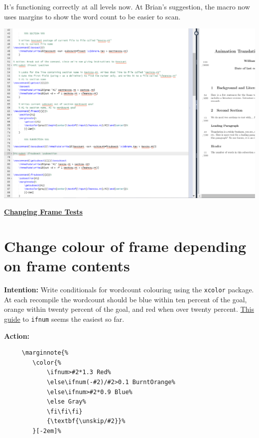 \documentclass[12pt]{article}
\begin{document}
It's functioning correctly at all levels now. At Brian's suggestion, the macro now uses margins to show the word count to be easier to scan.

\includegraphics[width=\textwidth]{imgelaborationmargincount.PNG}

\newpage\underline{\textbf{\Large{Changing Frame Tests}}}

\section{\large Change colour of frame depending on frame contents}

\textbf{Intention:} Write conditionals for wordcount colouring using the \texttt{xcolor} package. At each recompile the wordcount should be blue within ten percent of the goal, orange within twenty percent of the goal, and red when over twenty percent. \href{https://en.wikibooks.org/wiki/TeX/ifnum}{This guide} to \texttt{ifnum} seems the easiest so far.

\textbf{Action:} \begin{verbatim}
     \marginnote{%
        \color{%
            \ifnum>#2*1.3 Red%
            \else\ifnum(-#2)/#2>0.1 BurntOrange%
            \else\ifnum>#2*0.9 Blue%
            \else Gray%
            \fi\fi\fi}
            {\textbf{\unskip/#2}}%
        }[-2em]%
\end{verbatim}
\end{document}
